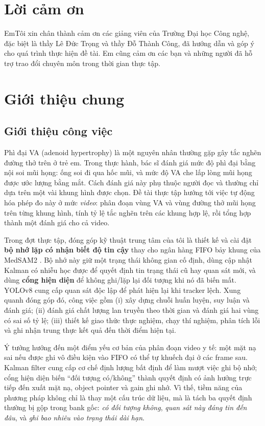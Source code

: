 \documentclass[a4paper,12pt]{report}
\begin{document}
\section*{Lời cảm ơn}
EmTôi xin chân thành cảm ơn các giảng viên của Trường Đại học Công nghệ, đặc biệt là thầy Lê Đức Trọng và thầy Đỗ Thành Công, đã hướng dẫn và góp ý cho quá trình thực hiện đề tài. Em cũng cảm ơn các bạn và những người đã hỗ trợ trao đổi chuyên môn trong thời gian thực tập.

\newpage
\section{Giới thiệu chung}
\subsection{Giới thiệu công việc}

Phì đại VA (adenoid hypertrophy) là một nguyên nhân thường gặp gây tắc nghẽn đường thở trên ở trẻ em. Trong thực hành, bác sĩ đánh giá mức độ phì đại bằng nội soi mũi họng: ống soi đi qua hốc mũi, và mức độ VA che lấp lòng mũi họng được ước lượng bằng mắt. Cách đánh giá này phụ thuộc người đọc và thường chỉ dựa trên một vài khung hình được chọn. Đề tài thực tập hướng tới việc tự động hóa phép đo này ở mức \emph{ video}: phân đoạn vùng VA và vùng đường thở mũi họng trên từng khung hình, tính tỷ lệ tắc nghẽn trên các khung hợp lệ, rồi tổng hợp thành một đánh giá cho cả video.

Trong đợt thực tập, đóng góp kỹ thuật trung tâm của tôi là thiết kế và cài đặt \textbf{bộ nhớ lặp có nhận biết độ tin cậy} thay cho ngân hàng FIFO bảy khung của MedSAM2 \cite{medsam2}. Bộ nhớ này giữ một trạng thái không gian cố định, dùng cập nhật Kalman có nhiễu học được để quyết định tin trạng thái cũ hay quan sát mới, và dùng \textbf{cổng hiện diện} để không ghi/lặp lại đối tượng khi nó đã biến mất. YOLOv8 cung cấp quan sát độc lập để phát hiện lại khi tracker lệch. Xung quanh đóng góp đó, công việc gồm (i) xây dựng chuỗi huấn luyện, suy luận và đánh giá; (ii) đánh giá chất lượng lan truyền theo thời gian và đánh giá hai vùng có sai số tỷ lệ; (iii) thiết kế giao thức thực nghiệm, chạy thí nghiệm, phân tích lỗi và ghi nhận trung thực kết quả đến thời điểm hiện tại.

Ý tưởng hướng đến một điểm yếu cơ bản của phân đoạn video y tế: một mặt nạ sai nếu được ghi vô điều kiện vào FIFO có thể tự khuếch đại ở các frame sau. Kalman filter cung cấp cơ chế định lượng bất định để làm mượt việc ghi bộ nhớ; cổng hiện diện biến ``đối tượng có/không'' thành quyết định có ảnh hưởng trực tiếp đến xuất mặt nạ, object pointer và gain ghi nhớ. Vì thế, tiềm năng của phương pháp không chỉ là thay một cấu trúc dữ liệu, mà là tách ba quyết định thường bị gộp trong bank gốc: \emph{có đối tượng không}, \emph{quan sát này đáng tin đến đâu}, và \emph{ghi bao nhiêu vào trạng thái dài hạn}.
\end{document}
